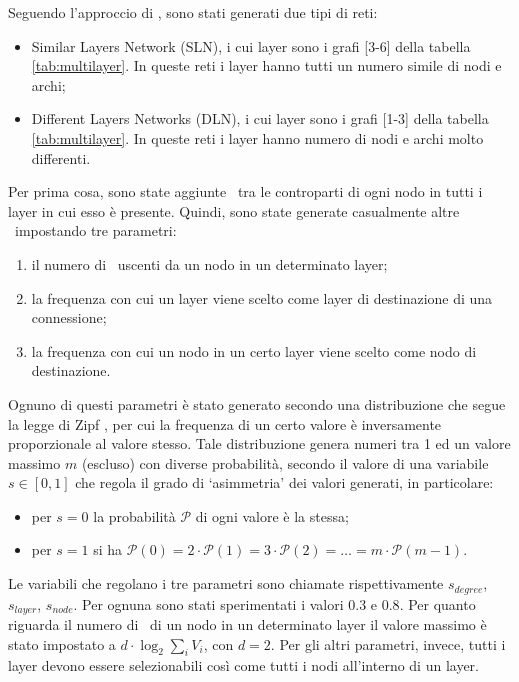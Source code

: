 Seguendo l'approccio di \cite{basaras:infspmul}, sono stati generati due tipi di reti:
\begin{itemize}
    \item Similar Layers Network (SLN), i cui layer sono i grafi [3-6] della  
            tabella \vref{tab:multilayer}. In queste reti i layer hanno tutti un numero simile 
            di nodi e archi;
    \item Different Layers Networks (DLN), i cui layer sono i grafi [1-3] della tabella 
        \ref{tab:multilayer}. In queste reti i layer hanno numero di nodi e archi molto differenti.
\end{itemize}


Per prima cosa, sono state aggiunte \interc\ tra le controparti di ogni nodo in tutti 
i layer in cui esso è presente.
Quindi, sono state generate casualmente altre \interc\ impostando tre parametri:
\begin{enumerate}
    \item il numero di \interc\ uscenti da un nodo in un determinato layer;
    \item la frequenza con cui un layer viene scelto come layer di destinazione di 
        una connessione;
    \item la frequenza con cui un nodo in un certo layer viene scelto come nodo 
        di destinazione. 
\end{enumerate}
Ognuno di questi parametri è stato generato secondo una distribuzione che segue 
la legge di Zipf \cite{zipf:humanb}, per cui la frequenza di un certo valore è inversamente
proporzionale al valore stesso. 
Tale distribuzione genera numeri tra 1 ed un valore massimo $m$ (escluso) con diverse probabilità,
secondo il valore di una variabile $s \in [0, 1]$
che regola il grado di `asimmetria' dei valori generati, in particolare:
\begin{itemize}
    \item per $s=0$ la probabilità $\mathcal{P}$ di ogni valore è la stessa;  
    \item per $s=1$ si ha $\mathcal{P}(0) = 2 \cdot \mathcal{P}(1) = 3 \cdot \mathcal{P}(2) =\dots = m \cdot \mathcal{P}(m-1)$. 
\end{itemize}

Le variabili che regolano i tre parametri sono chiamate rispettivamente
$s_{degree}$, $s_{layer}$, $s_{node}$. 
Per ognuna sono stati sperimentati i valori $0.3$ e $0.8$. 
Per quanto riguarda il numero di \interc\ di un nodo in un determinato layer
il valore massimo è stato impostato a $d \cdot \log_2{\sum_{i}{V_i}}$, con 
$d = 2$. Per gli altri parametri, invece, tutti i layer devono essere selezionabili
così come tutti i nodi all'interno di un layer.

